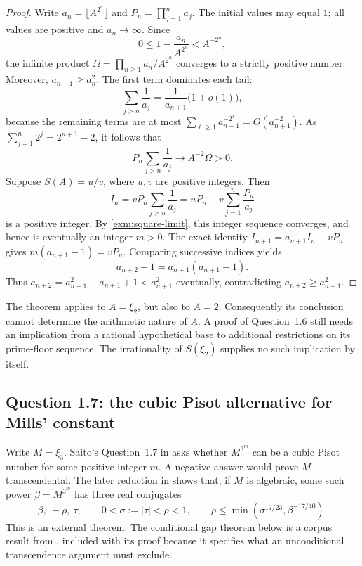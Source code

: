 \documentclass[11pt,a4paper]{article}
\numberwithin{equation}{section}
\theoremstyle{definition}
\theoremstyle{remark}
\begin{document}
\begin{proof}
Write \(a_n=\lfloor A^{2^n}\rfloor\) and
\(P_n=\prod_{j=1}^n a_j\). The initial values may equal \(1\);
all values are positive and \(a_n\to\infty\). Since
\[
 0\le1-\frac{a_n}{A^{2^n}}<A^{-2^n},
\]
the infinite product
\(\Omega=\prod_{n\ge1}a_n/A^{2^n}\)
converges to a strictly positive number. Moreover,
\(a_{n+1}\ge a_n^2\). The first term dominates each tail:
\[
 \sum_{j>n}\frac1{a_j}
 =\frac1{a_{n+1}}\bigl(1+o(1)\bigr),
\]
because the remaining terms are at most
\(\sum_{\ell\ge1}a_{n+1}^{-2^\ell}
 =O(a_{n+1}^{-2})\).
As \(\sum_{j=1}^n2^j=2^{n+1}-2\), it follows that
\begin{equation}\label{exm:square-limit}
 P_n\sum_{j>n}\frac1{a_j}\longrightarrow A^{-2}\Omega>0.
\end{equation}
Suppose \(S(A)=u/v\), where \(u,v\) are positive integers.
Then
\[
 I_n=vP_n\sum_{j>n}\frac1{a_j}
 =uP_n-v\sum_{j=1}^n\frac{P_n}{a_j}
\]
is a positive integer. By \eqref{exm:square-limit}, this integer
sequence converges, and hence is eventually an integer \(m>0\).
The exact identity
\(I_{n+1}=a_{n+1}I_n-vP_n\)
gives \(m(a_{n+1}-1)=vP_n\). Comparing successive indices yields
\[
 a_{n+2}-1=a_{n+1}(a_{n+1}-1).
\]
Thus \(a_{n+2}=a_{n+1}^2-a_{n+1}+1<a_{n+1}^2\) eventually,
contradicting \(a_{n+2}\ge a_{n+1}^2\).
\end{proof}

The theorem applies to \(A=\xi_2\), but also to \(A=2\).
Consequently its conclusion cannot determine the arithmetic
nature of \(A\). A proof of Question~1.6 still needs an implication
from a rational hypothetical base to additional restrictions on its
prime-floor sequence. The irrationality of \(S(\xi_2)\) supplies no
such implication by itself.

\subsection{Question 1.7: the cubic Pisot alternative for Mills' constant}
\label{exm:mills}

Write \(M=\xi_3\). Saito's Question~1.7 in \cite{Saito2025}
asks whether \(M^{3^m}\) can be a cubic Pisot number for some
positive integer \(m\). A negative answer would prove \(M\)
transcendental. The later reduction in
\cite[Theorem~1.7]{SaitoVariants} shows that, if \(M\) is algebraic,
some such power \(\beta=M^{3^m}\) has three real conjugates
\begin{equation}\label{exm:saito-reduction}
 \beta,\ -\rho,\ \tau,\qquad
 0<\sigma:=|\tau|<\rho<1,\qquad
 \rho\le\min(\sigma^{17/23},\beta^{-17/40}).
\end{equation}
This is an external theorem. The conditional gap theorem below
is a corpus result from \cite{VMRC010}, included with its proof because
it specifies what an unconditional transcendence argument must exclude.
\end{document}
